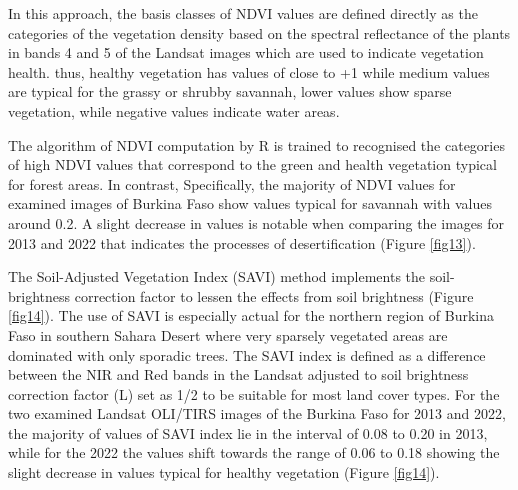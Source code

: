 \documentclass[atmosphere,article,submit,pdftex,moreauthors]{Definitions/mdpi}
\begin{document}
In this approach, the basis classes of NDVI values are defined directly as the categories of the vegetation density based on the spectral reflectance of the plants in bands 4 and 5 of the Landsat images which are used to indicate vegetation health. thus, healthy vegetation has values of close to +1 while medium values are typical for the grassy or shrubby savannah, lower values show sparse vegetation, while negative values indicate water areas. 

The algorithm of NDVI computation by R is trained to recognised   the categories of high NDVI values that correspond to the green and health vegetation typical for forest areas. In contrast, Specifically, the majority of NDVI values for examined images of Burkina Faso show values typical for savannah with values around 0.2. A slight decrease in values is notable when comparing the images for 2013 and 2022 that indicates the processes of desertification (Figure \ref{fig13}).

The Soil-Adjusted Vegetation Index (SAVI) method implements the soil-brightness correction factor to lessen the effects from soil brightness (Figure \ref{fig14}). The use of SAVI is especially actual for the northern region of Burkina Faso in southern Sahara Desert where very sparsely vegetated areas are dominated with only sporadic trees. The SAVI index is defined as a difference between the NIR and Red bands in the Landsat adjusted to soil brightness correction factor (L) set as 1/2 to be suitable for most land cover types. For the two examined Landsat OLI/TIRS images of the Burkina Faso for 2013 and 2022, the majority of values of SAVI index lie in the interval of 0.08 to 0.20 in 2013, while for the 2022 the values shift towards the range of 0.06 to 0.18 showing the slight decrease in values typical for healthy vegetation (Figure \ref{fig14}).
\end{document}
